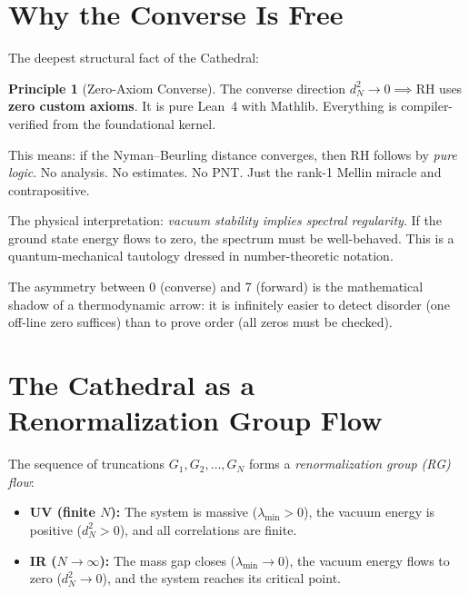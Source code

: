 \documentclass[11pt,a4paper]{article}
\theoremstyle{definition}
\newtheorem{principle}[observation]{Principle}
\newcommand{\RH}{\mathrm{RH}}
\begin{document}
\section{Why the Converse Is Free}
\label{sec:free}

The deepest structural fact of the Cathedral:

\begin{principle}[Zero-Axiom Converse]
The converse direction $d_N^2 \to 0 \implies \RH$ uses
\textbf{zero custom axioms}. It is pure Lean~4 with Mathlib.
Everything is compiler-verified from the foundational kernel.
\end{principle}

This means: if the Nyman--Beurling distance converges, then RH
follows by \emph{pure logic}. No analysis. No estimates. No PNT.
Just the rank-1 Mellin miracle and contrapositive.

The physical interpretation: \emph{vacuum stability implies spectral
regularity}. If the ground state energy flows to zero, the spectrum
must be well-behaved. This is a quantum-mechanical tautology dressed
in number-theoretic notation.

The asymmetry between 0 (converse) and 7 (forward) is the
mathematical shadow of a thermodynamic arrow: it is infinitely
easier to detect disorder (one off-line zero suffices) than to
prove order (all zeros must be checked).

\section{The Cathedral as a Renormalization Group Flow}

The sequence of truncations $G_1, G_2, \ldots, G_N$ forms a
\emph{renormalization group (RG) flow}:

\begin{itemize}
  \item \textbf{UV (finite $N$):} The system is massive
    ($\lambda_{\min} > 0$), the vacuum energy is positive
    ($d_N^2 > 0$), and all correlations are finite.
  \item \textbf{IR ($N \to \infty$):} The mass gap closes
    ($\lambda_{\min} \to 0$), the vacuum energy flows to zero
    ($d_N^2 \to 0$), and the system reaches its critical point.
\end{itemize}
\end{document}
